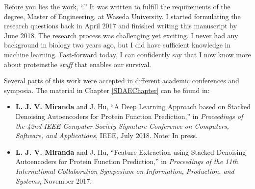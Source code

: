 %
%
%
%
%

\par Before you lies the work, ``\ttitle.'' It was written to fulfill the
requirements of the degree, Master of Engineering, at Waseda University. I
started formulating the research questions back in April 2017 and finished
writing this manuscript by June 2018. The research process was challenging yet
exciting. I never had any background in biology two years ago, but I did have
sufficient knowledge in machine learning. Fast-forward today, I can confidently
say that I now know more about proteins\textemdash the \textit{stuff} that
enables our survival.

\par Several parts of this work were
accepted in different academic conferences and symposia. The material in
Chapter \ref{SDAEChapter} can be found in:

\begin{itemize}
    \item \textbf{L. J. V. Miranda} and J. Hu, ``A Deep Learning Approach based
    on Stacked Denoising Autoencoders for Protein Function Prediction,'' in
    \textit{Proceedings of the 42nd IEEE Computer Society Signature Conference
    on Computers, Software, and Applications}, IEEE, July 2018. Note: In press.
    \item \textbf{L. J. V. Miranda} and  J. Hu, ``Feature Extraction using Stacked
    Denoising Autoencoders for Protein Function Prediction,'' in \textit{Proceedings of
    the 11th International Collaboration Symposium on Information, Production,
    and Systems}, November 2017.
\end{itemize}

